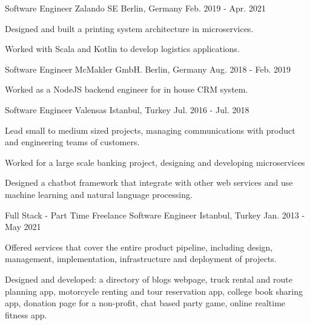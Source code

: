 \begin{cventries}
  \cventry
    {Software Engineer}
    {Zalando SE}
    {Berlin, Germany}
    {Feb. 2019 - Apr. 2021}
    {
      \begin{cvitems}
        \item {Designed and built a printing system architecture in microservices.}
        \item {Worked with Scala and Kotlin to develop logistics applications.}
      \end{cvitems}
    }


  \cventry
    {Software Engineer}
    {McMakler GmbH.}
    {Berlin, Germany}
    {Aug. 2018 - Feb. 2019}
    {
      \begin{cvitems}
        \item {Worked as a NodeJS backend engineer for in house CRM system.}
      \end{cvitems}
    }

  \cventry
    {Software Engineer}
    {Valensas}
    {Istanbul, Turkey}
    {Jul. 2016 - Jul. 2018}
    {
      \begin{cvitems}
        \item {Lead small to medium sized projects, managing communications with product and engineering teams of customers.}
        \item {Worked for a large scale banking project, designing and developing microservices}
        \item {Designed a chatbot framework that integrate with other web services and use machine learning and natural language processing.}
      \end{cvitems}
    }

  \cventry
    {Full Stack - Part Time}
    {Freelance Software Engineer}
    {Istanbul, Turkey}
    {Jan. 2013 - May 2021}
    {
      \begin{cvitems}
        \item {Offered services that cover the entire product pipeline, including design, management, implementation, infrastructure and deployment of projects.}
        \item {Designed and developed: a directory of blogs webpage, truck rental and route planning app, motorcycle renting and tour reservation app, college book sharing app, donation page for a non-profit, chat based party game, online realtime fitness app.}
      \end{cvitems}
    }    
    

\end{cventries}
